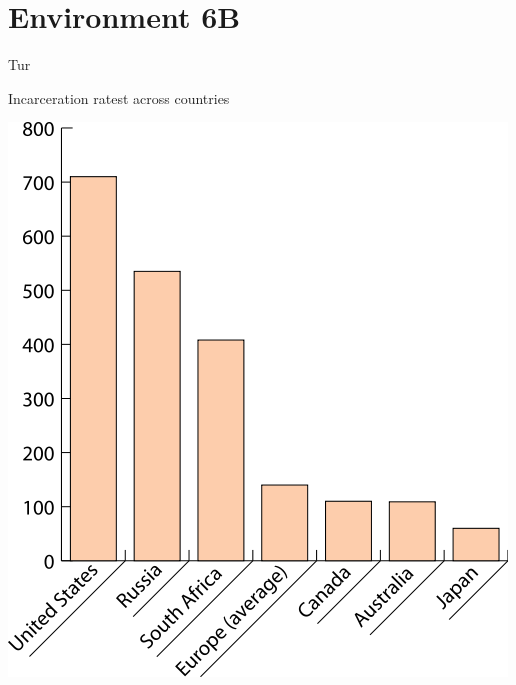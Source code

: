 
\section{Environment 6B}

\begin{map}{T}{ur}
\caption{Incarceration ratest across countries}
\label{chart:incarceration}
\includegraphics[width=\chartwidth,height=\chartheight]{incarceration}  
\end{map}

\lipsum[1-4]

